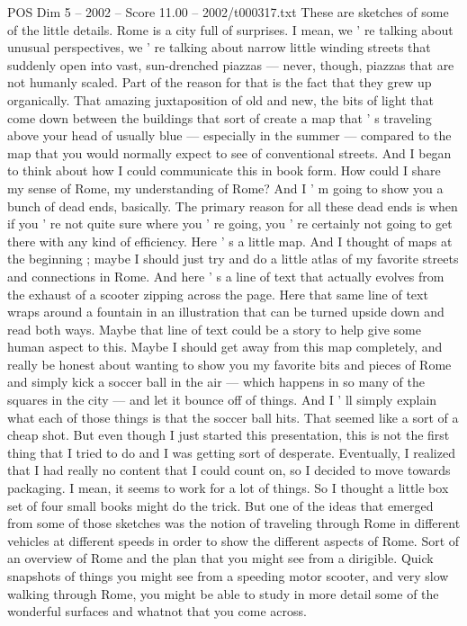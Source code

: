 \begin{textsample}{POS Dim 5 – 2002 – Score 11.00 – 2002/t000317.txt}
These are sketches of some of the little details.
Rome is a city full of surprises.
I mean, we ' re talking about unusual perspectives, we ' re talking about narrow little winding streets that suddenly open into vast, sun-drenched piazzas — never, though, piazzas that are not humanly scaled.
Part of the reason for that is the fact that they grew up organically.
That amazing juxtaposition of old and new, the bits of light that come down between the buildings that sort of create a map that ' s traveling above your head of usually blue — especially in the summer — compared to the map that you would normally expect to see of conventional streets.
And I began to think about how I could communicate this in book form.
How could I share my sense of Rome, my understanding of Rome?
And I ' m going to show you a bunch of dead ends, basically.
The primary reason for all these dead ends is when if you ' re not quite sure where you ' re going, you ' re certainly not going to get there with any kind of efficiency.
Here ' s a little map.
And I thought of maps at the beginning ; maybe I should just try and do a little atlas of my favorite streets and connections in Rome.
And here ' s a line of text that actually evolves from the exhaust of a scooter zipping across the page.
Here that same line of text wraps around a fountain in an illustration that can be turned upside down and read both ways.
Maybe that line of text could be a story to help give some human aspect to this.
Maybe I should get away from this map completely, and really be honest about wanting to show you my favorite bits and pieces of Rome and simply kick a soccer ball in the air — which happens in so many of the squares in the city — and let it bounce off of things.
And I ' ll simply explain what each of those things is that the soccer ball hits.
That seemed like a sort of a cheap shot.
But even though I just started this presentation, this is not the first thing that I tried to do and I was getting sort of desperate.
Eventually, I realized that I had really no content that I could count on, so I decided to move towards packaging.
I mean, it seems to work for a lot of things.
So I thought a little box set of four small books might do the trick.
But one of the ideas that emerged from some of those sketches was the notion of traveling through Rome in different vehicles at different speeds in order to show the different aspects of Rome.
Sort of an overview of Rome and the plan that you might see from a dirigible.
Quick snapshots of things you might see from a speeding motor scooter, and very slow walking through Rome, you might be able to study in more detail some of the wonderful surfaces and whatnot that you come across.

\end{textsample}
